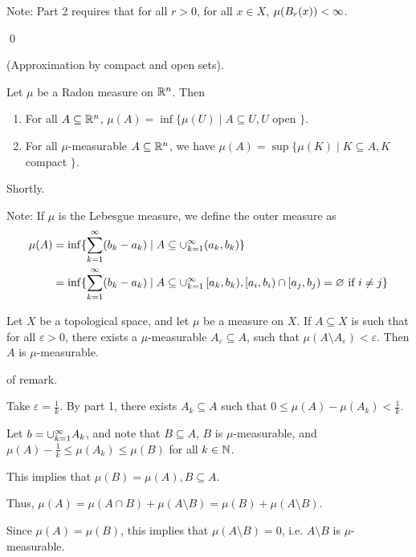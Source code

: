 \documentclass[x11names,reqno,14pt]{extarticle}
\newcommand{\seq}[2][\oo]{_{#2 = 1}^#1}
\newcommand{\cupk}[1][\oo]{\cup\seq[#1]{k}}
\begin{document}
\begin{enumerate}
Note: Part 2 requires that for all $r>0$, for all $x \in X$, $\mu(B_r(x))<\infty$. 




\end{enumerate}

\qed

\thm (Approximation by compact and open sets). 

Let $\mu$ be a Radon measure on $\mathbb{R}^n$. Then 
\begin{enumerate}

\item For all $A \subseteq\mathbb{R}^n$, $\mu(A) = \inf\{\mu(U) \mid A \subseteq U, U$ open $\}$. 

\item For all $\mu$-measurable $A \subseteq\mathbb{R}^n$, we have $\mu(A) = \sup\{\mu(K) \mid K\subseteq A, K$ compact $\}$. 

\end{enumerate}

\proof

Shortly. 

Note: If $\mu$ is the Lebesgue measure, we define the outer measure as
\begin{align*}
\mu(A) & = \inf\{\sum\seq{k}(b_k - a_k) \mid A \subseteq\cupk(a_k, b_k) \} \\
& = \inf\{\sum\seq{k}(b_k - a_k)\mid A \subseteq \cupk\, [a_k, b_k), [a_i, b_i) \cap [a_j, b_j) = \varnothing\text{ if } i\neq j\} \\
\end{align*}

\rem Let $X$ be a topological space, and let $\mu$ be a measure on $X$. If $A \subseteq X$ is such that for all $\varepsilon>0$, there exists a $\mu$-measurable $A_\varepsilon\subseteq A$, such that $\mu(A\setminus A_\varepsilon)<\varepsilon$. Then $A$ is $\mu$-measurable. 

\proof of remark. 

Take $\varepsilon = \frac{1}{k}$. By part 1, there exists $A_k \subseteq A$ such that $0\leq\mu(A)-\mu(A_k)<\frac{1}{k}$. 

Let $b = \cupk A_k$, and note that $B \subseteq A$, $B$ is $\mu$-measurable, and $\mu(A)-\frac{1}{k} \leq \mu(A_k) \leq \mu(B) $ for all $k \in \mathbb{N}$. 

This implies that $\mu(B) = \mu(A), B \subseteq A$. 

Thus, $\mu(A) = \mu(A\cap B) + \mu(A\setminus B) = \mu(B) + \mu(A\setminus B)$. 

Since $\mu(A) = \mu(B)$, this implies that $\mu(A\setminus B) = 0$, i.e. $A\setminus B$ is $\mu$-measurable. 
\end{document}
